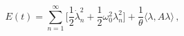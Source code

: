 \begin{equation}
E(t) = \sum_{n=1}^\infty \bigl[\frac12\dot\lambda_n^2 +\frac12\omega_0^2
\lambda_n^2\bigr] + \frac1\theta\langle\lambda,A\lambda\rangle \,,
\end{equation}

